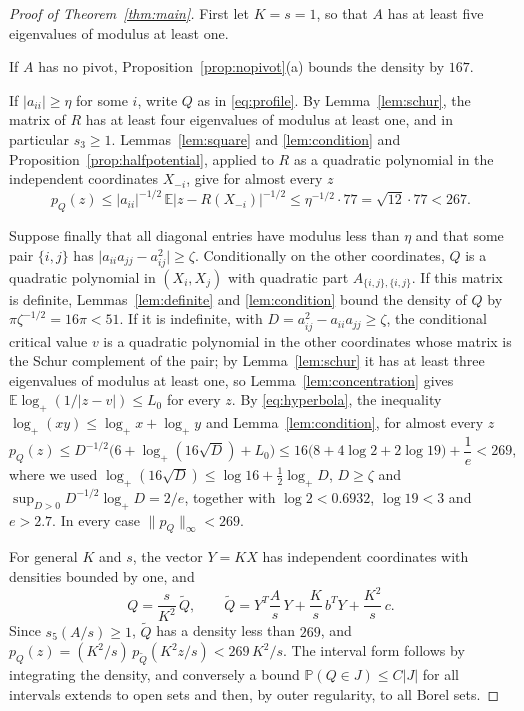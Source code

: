 \documentclass[11pt]{amsart}
\numberwithin{equation}{section}
\theoremstyle{definition}
\theoremstyle{remark}
\newcommand{\E}{\mathbb E}
\newcommand{\PP}{\mathbb P}
\newcommand{\1}{\mathbf 1}
\newcommand{\logp}{\log_+}
\newcommand{\norm}[1]{\lVert #1\rVert}
\newcommand{\abs}[1]{\lvert #1\rvert}
\begin{document}
\begin{proof}[Proof of Theorem~\ref{thm:main}]
First let $K=s=1$, so that $A$ has at least five eigenvalues of modulus at least one.

If $A$ has no pivot, Proposition~\ref{prop:nopivot}(a) bounds the density by $167$.

If $\abs{a_{ii}}\ge\eta$ for some $i$, write $Q$ as in \eqref{eq:profile}. By Lemma~\ref{lem:schur}, the matrix of $R$ has at least four eigenvalues of modulus at least one, and in particular $s_3\ge1$. Lemmas~\ref{lem:square} and \ref{lem:condition} and Proposition~\ref{prop:halfpotential}, applied to $R$ as a quadratic polynomial in the independent coordinates $X_{-i}$, give for almost every $z$
\[
p_Q(z)\le\abs{a_{ii}}^{-1/2}\,\E\abs{z-R(X_{-i})}^{-1/2}\le\eta^{-1/2}\cdot77=\sqrt{12}\cdot77<267 .
\]

Suppose finally that all diagonal entries have modulus less than $\eta$ and that some pair $\{i,j\}$ has $\abs{a_{ii}a_{jj}-a_{ij}^2}\ge\zeta$. Conditionally on the other coordinates, $Q$ is a quadratic polynomial in $(X_i,X_j)$ with quadratic part $A_{\{i,j\},\{i,j\}}$. If this matrix is definite, Lemmas~\ref{lem:definite} and \ref{lem:condition} bound the density of $Q$ by $\pi\zeta^{-1/2}=16\pi<51$. If it is indefinite, with $D=a_{ij}^2-a_{ii}a_{jj}\ge\zeta$, the conditional critical value $v$ is a quadratic polynomial in the other coordinates whose matrix is the Schur complement of the pair; by Lemma~\ref{lem:schur} it has at least three eigenvalues of modulus at least one, so Lemma~\ref{lem:concentration} gives $\E\logp(1/\abs{z-v})\le L_0$ for every $z$. By \eqref{eq:hyperbola}, the inequality $\logp(xy)\le\logp x+\logp y$ and Lemma~\ref{lem:condition}, for almost every $z$
\[
p_Q(z)\le D^{-1/2}\bigl(6+\logp(16\sqrt D)+L_0\bigr)\le16\bigl(8+4\log2+2\log19\bigr)+\frac1e<269,
\]
where we used $\logp(16\sqrt D)\le\log16+\frac12\logp D$, $D\ge\zeta$ and $\sup_{D>0}D^{-1/2}\logp D=2/e$, together with $\log2<0.6932$, $\log19<3$ and $e>2.7$. In every case $\norm{p_Q}_\infty<269$.

For general $K$ and $s$, the vector $Y=KX$ has independent coordinates with densities bounded by one, and
\[
Q=\frac s{K^2}\,\widetilde Q,\qquad\widetilde Q=Y^T\frac As\,Y+\frac Ks\,b^TY+\frac{K^2}s\,c .
\]
Since $s_5(A/s)\ge1$, $\widetilde Q$ has a density less than $269$, and $p_Q(z)=(K^2/s)\,p_{\widetilde Q}(K^2z/s)<269\,K^2/s$. The interval form follows by integrating the density, and conversely a bound $\PP(Q\in J)\le C\abs J$ for all intervals extends to open sets and then, by outer regularity, to all Borel sets.
\end{proof}
\end{document}
